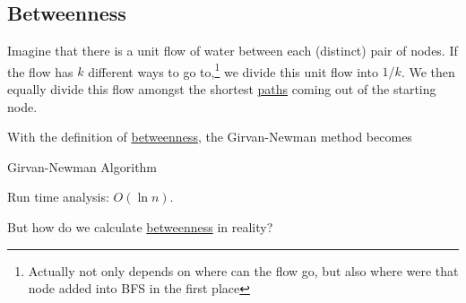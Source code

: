 \subsection{Betweenness}
\begin{definition}[Betweenness]\label{def:betweenness}
	Imagine that there is a unit flow of water between each (distinct) pair of nodes. If the flow has \(k\) different ways to go to,\footnote{Actually not only depends on where can the flow go, but also where were that node added into BFS in the first place}
	we divide this unit flow into \(1/k\). We then equally divide this flow amongst the shortest \hyperref[def:path]{paths} coming out of the starting node.
\end{definition}

With the definition of \hyperref[def:betweenness]{betweenness}, the Girvan-Newman method becomes


\par
\begin{algorithm}[H]\label{algo:Girvan-Newman-algorithm}
	\DontPrintSemicolon
	\caption{Girvan-Newman Algorithm}
	\BlankLine

	\;
	\Return{}\;
\end{algorithm}

\begin{remark}
	Run time analysis: \(O(\ln n)\).
\end{remark}

\begin{problem}
But how do we calculate \hyperref[def:betweenness]{betweenness} in reality?
\end{problem}

